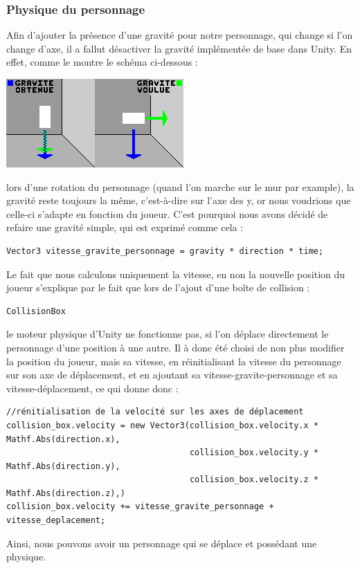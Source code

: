 ﻿\documentclass{article}
\begin{document}
\subsubsection{Physique du personnage} \label{physique_personnage}
Afin d'ajouter la présence d'une gravité pour notre personnage, qui change si l'on change d'axe,
il a fallut désactiver la gravité implémentée de base dans Unity. En effet, comme le montre le schéma
ci-dessous :

\centerline{\includegraphics[scale=1.5]{explication_gravite.png}}

lors d'une rotation du personnage (quand l'on marche sur le mur par example), la gravité reste toujours la
même, c'est-à-dire sur l'axe des y, or nous voudrions que celle-ci s'adapte en fonction du joueur.
C'est pourquoi nous avons décidé de refaire une gravité simple, qui est exprimé comme cela :
\begin{verbatim}
Vector3 vitesse_gravite_personnage = gravity * direction * time;
\end{verbatim}
Le fait que nous calculons uniquement la vitesse, en non la nouvelle position du joueur
s'explique par le fait que lors de l'ajout d'une boîte de collision :
\begin{verbatim}
CollisionBox
\end{verbatim}
le moteur physique d'Unity ne fonctionne pas, si l'on déplace directement
le personnage d'une position à une autre. Il à donc été choisi de non plus modifier la position
du joueur, mais sa vitesse, en réinitialisant la vitesse du personnage sur son axe de déplacement,
et en ajoutant sa vitesse-gravite-personnage et sa vitesse-déplacement, ce qui donne donc :
\begin{verbatim}
//rénitialisation de la velocité sur les axes de déplacement
collision_box.velocity = new Vector3(collision_box.velocity.x * Mathf.Abs(direction.x),
                                     collision_box.velocity.y * Mathf.Abs(direction.y),
                                     collision_box.velocity.z * Mathf.Abs(direction.z),)
collision_box.velocity += vitesse_gravite_personnage + vitesse_deplacement;
\end{verbatim}
Ainsi, nous pouvons avoir un personnage qui se déplace et possédant une physique.
\end{document}
